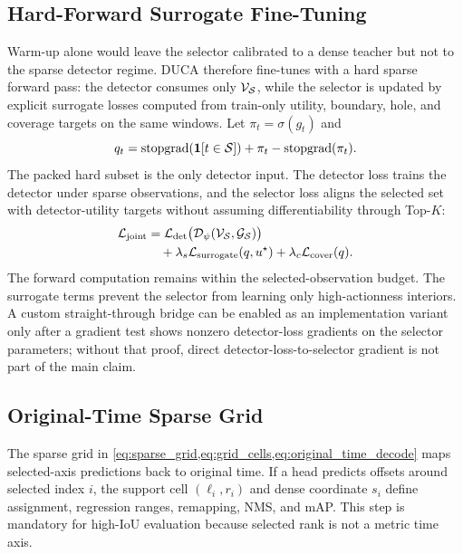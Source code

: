 \subsection{Hard-Forward Surrogate Fine-Tuning}

Warm-up alone would leave the selector calibrated to a dense teacher but not to
the sparse detector regime. DUCA therefore fine-tunes with a hard sparse forward
pass: the detector consumes only $\mathcal{V}_{\mathcal{S}}$, while the selector is
updated by explicit surrogate losses computed from train-only utility,
boundary, hole, and coverage targets on the same windows. Let $\pi_t=\sigma(g_t)$ and
\begin{equation}
    q_t
    =
    \mathrm{stopgrad}(\mathbf{1}[t\in\mathcal{S}])
    + \pi_t - \mathrm{stopgrad}(\pi_t) .
    \label{eq:surrogate_mask}
\end{equation}
The packed hard subset is the only detector input. The detector loss trains the
detector under sparse observations, and the selector loss aligns the selected
set with detector-utility targets without assuming differentiability through
Top-$K$:
\begin{align}
    \mathcal{L}_{\mathrm{joint}}
    &=
    \mathcal{L}_{\mathrm{det}}
    \bigl(\mathcal{D}_\psi(\mathcal{V}_{\mathcal{S}},\mathcal{G}_{\mathcal{S}})\bigr)
    \notag\\
    &\quad
    + \lambda_s \mathcal{L}_{\mathrm{surrogate}}(q,u^\star)
    + \lambda_c \mathcal{L}_{\mathrm{cover}}(q).
    \label{eq:joint_loss}
\end{align}
The forward computation remains within the selected-observation budget. The
surrogate terms prevent the selector from learning only high-actionness
interiors. A custom straight-through bridge can be enabled as an implementation
variant only after a gradient test shows nonzero detector-loss gradients on the
selector parameters; without that proof, direct detector-loss-to-selector
gradient is not part of the main claim.

\subsection{Original-Time Sparse Grid}

The sparse grid in \cref{eq:sparse_grid,eq:grid_cells,eq:original_time_decode}
maps selected-axis predictions back to original time. If a head predicts offsets
around selected index $i$, the support cell $(\ell_i,r_i)$ and dense coordinate
$s_i$ define assignment, regression ranges, remapping, NMS, and mAP. This step
is mandatory for high-IoU evaluation because selected rank is not a metric time
axis.


